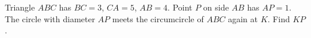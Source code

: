 Triangle $ABC$ has $BC=3$, $CA=5$, $AB=4$. Point $P$ on side $AB$ has $AP=1$. The circle with diameter $AP$ meets the circumcircle of $ABC$ again at $K$. Find $KP$.
